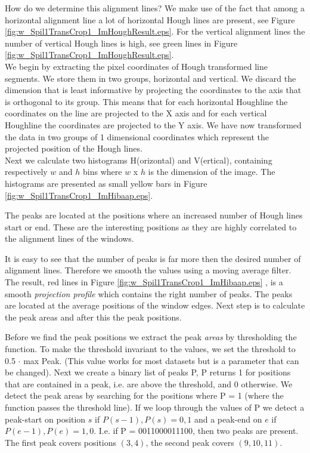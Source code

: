 How do we determine this alignment lines? We make use of the fact that among a
horizontal alignment line a lot of horizontal Hough lines are present, see
Figure \ref{fig:w_Spil1TransCrop1_ImHoughResult.eps}. For the vertical alignment lines
the number of vertical Hough lines is high, see green lines in Figure
\ref{fig:w_Spil1TransCrop1_ImHoughResult.eps}.\\

We begin by extracting the pixel coordinates of Hough transformed line
segments. We store them in two groups, horizontal and vertical.%
We discard the dimension that is least informative by projecting the coordinates to
the axis that is orthogonal to its group. 
This means that for each horizontal Houghline the coordinates on the line are projected to the X
axis and for each vertical Houghline the coordinates are projected to the Y
axis. We have now transformed the data in two groups of 1 dimensional
coordinates which represent the projected position of the Hough lines.\\

Next we calculate two histograms H(orizontal) and V(ertical), containing respectively
$w$ and $h$ bins where $w$ x $h$ is the dimension of the image.  The histograms
are presented as small yellow bars in Figure \ref{fig:w_Spil1TransCrop1_ImHibaap.eps}.

The peaks are located at the positions where an increased number of Hough lines
start or end.  These are the interesting positions as they are highly correlated
to the alignment lines of the windows. 

It is easy to see that the number of peaks is far more then the desired number of alignment lines.
Therefore we smooth the values using a moving average filter.
The result, red lines in Figure \ref{fig:w_Spil1TransCrop1_ImHibaap.eps}
, is a smooth \emph{projection profile} which contains the right number of peaks. The peaks
are located at the average positions of the window edges. Next step is to
calculate the peak areas and after this the peak positions. 

Before we find the peak positions we extract the peak \emph{areas} by thresholding the
function. To make the threshold invariant to the values, we set the threshold to 0.5 $\cdot$ max Peak. 
(This value works for most datasets but is a parameter that can be changed).
Next we create a binary list of peaks P, P returns 1 for positions that are contained in
a peak, i.e. are above the threshold, and 0 otherwise.
We detect the peak areas by searching for the positions where P = 1
(where the function passes the threshold line). 
If we loop through the values of P we detect a peak-start on position $s$ if ${P(s-1),P(s)}={0,1}$
and a peak-end on $e$ if ${P(e-1),P(e)}={1,0}$. 
I.e. if P = 0011000011100, then two peaks are present. The first peak covers positions $(3,4)$, 
the second peak covers $(9,10,11)$.\\

